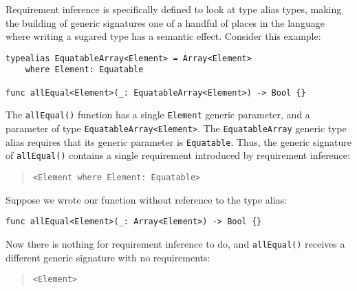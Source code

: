 \documentclass[../generics]{subfiles}
\begin{document}
\begin{example}
Requirement inference is specifically defined to look at type alias types, making the building of generic signatures one of a handful of places in the language where writing a sugared type has a semantic effect. Consider this example:
\begin{Verbatim}
typealias EquatableArray<Element> = Array<Element>
    where Element: Equatable

func allEqual<Element>(_: EquatableArray<Element>) -> Bool {}
\end{Verbatim}
The \texttt{allEqual()} function has a single \texttt{Element} generic parameter, and a parameter of type \texttt{EquatableArray<Element>}. The \texttt{EquatableArray} generic type alias requires that its generic parameter is \texttt{Equatable}. Thus, the generic signature of \texttt{allEqual()} contains a single requirement introduced by requirement inference:
\begin{quote}
\begin{verbatim}
<Element where Element: Equatable>
\end{verbatim}
\end{quote}

Suppose we wrote our function without reference to the type alias:
\begin{Verbatim}
func allEqual<Element>(_: Array<Element>) -> Bool {}
\end{Verbatim}
Now there is nothing for requirement inference to do, and \texttt{allEqual()} receives a different generic signature with no requirements:
\begin{quote}
\begin{verbatim}
<Element>
\end{verbatim}
\end{quote}
\end{example}
\end{document}

